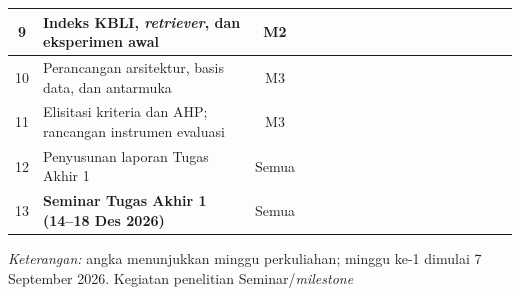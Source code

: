 \documentclass[12pt,a4paper]{report}
\newcommand{\ga}{\cellcolor{green!25}}
\newcommand{\ms}{\cellcolor{orange!50}}
\begin{document}
\begin{table}[H]
{\begin{tabular}{|c|>{\RaggedRight\arraybackslash}p{5.2cm}|c|*{15}{c|}}
    9 & Indeks KBLI, \textit{retriever}, dan eksperimen awal & M2 & & & & & & & & & & & \ga & \ga & \ga & \ga & \\ \hline
    10 & Perancangan arsitektur, basis data, dan antarmuka & M3 & & & & & & & & & & \ga & \ga & \ga & \ga & \ga & \\ \hline
    11 & Elisitasi kriteria dan AHP; rancangan instrumen evaluasi & M3 & & & & & & & & & & & & \ga & \ga & \ga & \\ \hline
    12 & Penyusunan laporan Tugas Akhir 1 & Semua & & & & & & & & & & & & & \ga & \ga & \\ \hline
    13 & \textbf{Seminar Tugas Akhir 1 (14--18 Des 2026)} & Semua & & & & & & & & & & & & & & & \ms \\ \hline
    \end{tabular}%
  }
  \begin{flushleft}
    \small \textit{Keterangan:} angka menunjukkan minggu perkuliahan; minggu ke-1 dimulai 7 September 2026. \colorbox{green!25}{\phantom{X}} Kegiatan penelitian \quad \colorbox{orange!50}{\phantom{X}} Seminar/\textit{milestone}
  \end{flushleft}
\end{table}
\end{document}
